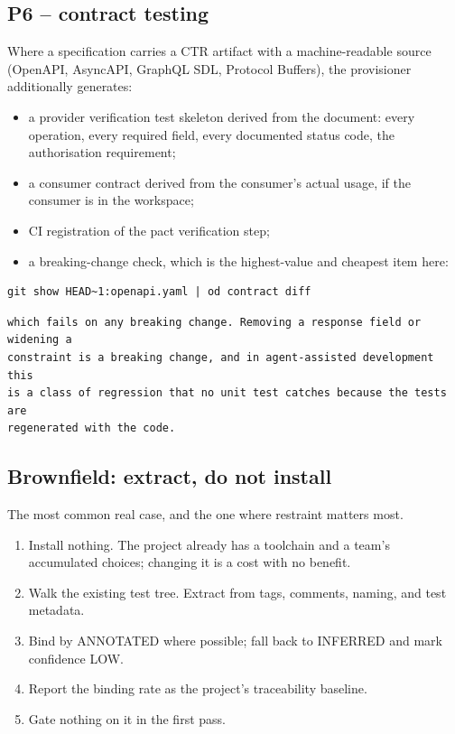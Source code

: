 \documentclass[11pt,a4paper]{article}
\begin{document}
\subsection{P6 -- contract testing}

Where a specification carries a CTR artifact with a machine-readable source (OpenAPI, AsyncAPI, GraphQL SDL, Protocol Buffers), the provisioner additionally generates:

\begin{itemize}[leftmargin=*,nosep,topsep=2pt]
\item a provider verification test skeleton derived from the document: every   operation, every required field, every documented status code, the   authorisation requirement;
\item a consumer contract derived from the consumer's actual usage, if the   consumer is in the workspace;
\item CI registration of the pact verification step;
\item a breaking-change check, which is the highest-value and cheapest item here:
\end{itemize}

\begin{Verbatim}[fontsize=\footnotesize,breaklines=true,breakanywhere=true,breakautoindent=false,samepage=false]
git show HEAD~1:openapi.yaml | od contract diff
\end{Verbatim}

\begin{Verbatim}[fontsize=\footnotesize,breaklines=true,breakanywhere=true,breakautoindent=false,samepage=false]
which fails on any breaking change. Removing a response field or widening a
constraint is a breaking change, and in agent-assisted development this
is a class of regression that no unit test catches because the tests are
regenerated with the code.
\end{Verbatim}

\subsection{Brownfield: extract, do not install}

The most common real case, and the one where restraint matters most.

\begin{enumerate}[leftmargin=*,nosep,topsep=2pt]
\item Install nothing. The project already has a toolchain and a team's    accumulated choices; changing it is a cost with no benefit.
\item Walk the existing test tree. Extract from tags, comments, naming, and    test metadata.
\item Bind by ANNOTATED where possible; fall back to INFERRED and mark    confidence LOW.
\item Report the binding rate as the project's traceability baseline.
\item Gate nothing on it in the first pass.
\end{enumerate}
\end{document}
